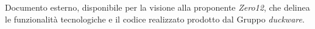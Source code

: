 Documento esterno, disponibile per la visione alla proponente \emph{Zero12}, che delinea le funzionalità tecnologiche e il codice realizzato prodotto dal Gruppo \emph{duckware}.